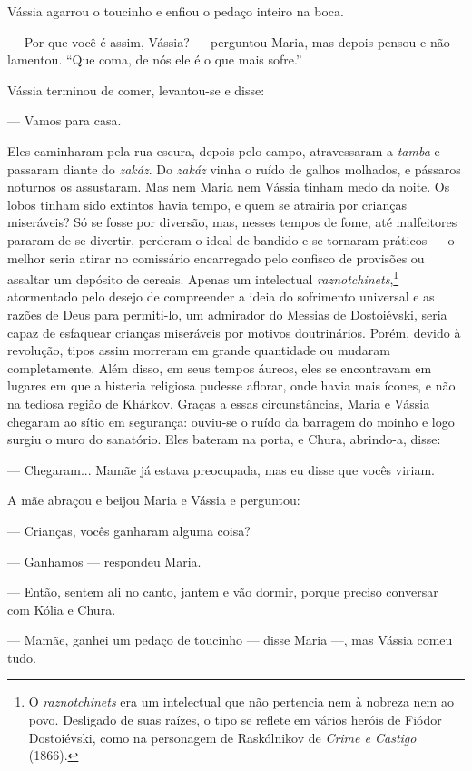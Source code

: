 Vássia agarrou o toucinho e enfiou o pedaço inteiro na boca.

--- Por que você é assim, Vássia? --- perguntou Maria, mas depois pensou
e não lamentou. ``Que coma, de nós ele é o que mais sofre.''

Vássia terminou de comer, levantou-se e disse:

--- Vamos para casa.

Eles caminharam pela rua escura, depois pelo campo, atravessaram a
\emph{tamba} e passaram diante do \emph{zakáz}. Do \emph{zakáz} vinha o
ruído de galhos molhados, e pássaros noturnos os assustaram. Mas nem
Maria nem Vássia tinham medo da noite. Os lobos tinham sido extintos
havia tempo, e quem se atrairia por crianças miseráveis? Só se fosse por
diversão, mas, nesses tempos de fome, até malfeitores pararam de se
divertir, perderam o ideal de bandido e se tornaram práticos --- o
melhor seria atirar no comissário encarregado pelo confisco de provisões
ou assaltar um depósito de cereais. Apenas um intelectual
\emph{raznotchinets},\footnote{O \emph{raznotchinets} era um intelectual
  que não pertencia nem à nobreza nem ao povo. Desligado de suas raízes,
  o tipo se reflete em vários heróis de Fiódor Dostoiévski, como na
  personagem de Raskólnikov de \emph{Crime e Castigo} (1866).}
atormentado pelo desejo de compreender a ideia do sofrimento universal e
as razões de Deus para permiti-lo, um admirador do Messias de
Dostoiévski, seria capaz de esfaquear crianças miseráveis por motivos
doutrinários. Porém, devido à revolução, tipos assim morreram em grande
quantidade ou mudaram completamente. Além disso, em seus tempos áureos,
eles se encontravam em lugares em que a histeria religiosa pudesse
aflorar, onde havia mais ícones, e não na tediosa região de Khárkov.
Graças a essas circunstâncias, Maria e Vássia chegaram ao sítio em
segurança: ouviu-se o ruído da barragem do moinho e logo surgiu o muro
do sanatório. Eles bateram na porta, e Chura, abrindo-a, disse:

--- Chegaram... Mamãe já estava preocupada, mas eu disse que vocês
viriam.

A mãe abraçou e beijou Maria e Vássia e perguntou:

--- Crianças, vocês ganharam alguma coisa?

--- Ganhamos --- respondeu Maria.

--- Então, sentem ali no canto, jantem e vão dormir, porque preciso
conversar com Kólia e Chura.

--- Mamãe, ganhei um pedaço de toucinho --- disse Maria ---, mas Vássia
comeu tudo.

